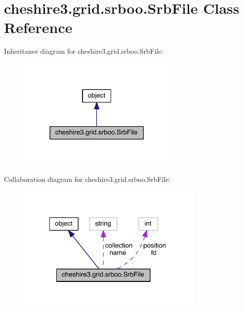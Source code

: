 \hypertarget{classcheshire3_1_1grid_1_1srboo_1_1_srb_file}{\section{cheshire3.\-grid.\-srboo.\-Srb\-File Class Reference}
\label{classcheshire3_1_1grid_1_1srboo_1_1_srb_file}
}


Inheritance diagram for cheshire3.\-grid.\-srboo.\-Srb\-File\-:
\nopagebreak
\begin{figure}[H]
\begin{center}
\leavevmode
\includegraphics[width=222pt]{classcheshire3_1_1grid_1_1srboo_1_1_srb_file__inherit__graph}
\end{center}
\end{figure}


Collaboration diagram for cheshire3.\-grid.\-srboo.\-Srb\-File\-:
\nopagebreak
\begin{figure}[H]
\begin{center}
\leavevmode
\includegraphics[width=257pt]{classcheshire3_1_1grid_1_1srboo_1_1_srb_file__coll__graph}
\end{center}
\end{figure}
